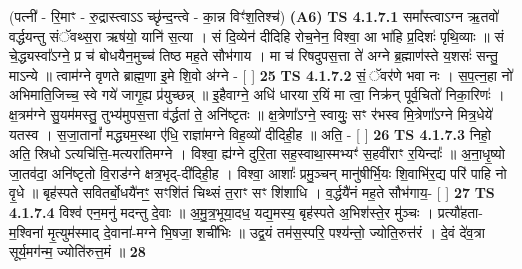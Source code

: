 \documentclass[17pt]{extarticle}
\begin{document}
                  \newline
                      (पत्नी॑ - रि॒माꣳ - रु॒द्रास्त्वाऽऽ च्छृ॑न्द॒न्त्वे - का॒न्न विꣳ॑श॒तिश्च॑)  \textbf{(A6)} \newline \newline
                                        \textbf{ TS 4.1.7.1} \newline
                  समा᳚स्त्वाऽग्न ऋ॒तवो॑ वर्द्धयन्तु संॅवथ्स॒रा ऋष॑यो॒ यानि॑ स॒त्या । सं दि॒व्येन॑ दीदिहि रोच॒नेन॒ विश्वा॒ आ भा॑हि प्र॒दिशः॑ पृथि॒व्याः ॥ सं चे॒द्ध्यस्वा᳚ऽग्ने॒ प्र च॑ बोधयैन॒मुच्च॑ तिष्ठ मह॒ते सौभ॑गाय । मा च॑ रिषदुपस॒त्ता ते॑ अग्ने ब्र॒ह्माण॑स्ते य॒शसः॑ सन्तु॒ माऽन्ये ॥ त्वाम॑ग्ने वृणते ब्राह्म॒णा इ॒मे शि॒वो अ॑ग्ने - [  ] \textbf{  25} \newline
                  \newline
                                \textbf{ TS 4.1.7.2} \newline
                  सं॒ ॅवर॑णे भवा नः । स॒प॒त्न॒हा नो॑ अभिमाति॒जिच्च॒ स्वे गये॑ जागृ॒ह्य प्र॑युच्छन्न् ॥ इ॒हैवाग्ने॒ अधि॑ धारया र॒यिं मा त्वा॒ निक्र॑न् पूर्व॒चितो॑ निका॒रिणः॑ । क्ष॒त्रम॑ग्ने सु॒यम॑मस्तु॒ तुभ्य॑मुपस॒त्ता व॑र्द्धतां ते॒ अनि॑ष्टृतः ॥ क्ष॒त्रेणा᳚ऽग्ने॒ स्वायुः॒ सꣳ र॑भस्व मि॒त्रेणा᳚ऽग्ने मित्र॒धेये॑ यतस्व । स॒जा॒तानां᳚ मद्ध्यम॒स्था ए॑धि॒ राज्ञा॑मग्ने विह॒व्यो॑ दीदिही॒ह ॥ अति॒ - [  ] \textbf{  26 } \newline
                  \newline
                                \textbf{ TS 4.1.7.3} \newline
                  निहो॒ अति॒ स्रिधो ऽत्यचि॑त्ति॒-मत्यरा॑तिमग्ने । विश्वा॒ ह्य॑ग्ने दुरि॒ता सह॒स्वाथा॒स्मभ्यꣳ॑ स॒हवी॑राꣳ र॒यिन्दाः᳚ ॥ अ॒ना॒धृ॒ष्यो जा॒तव॑दा॒ अनि॑ष्टृतो वि॒राड॑ग्ने क्षत्र॒भृद्-दी॑दिही॒ह । विश्वा॒ आशाः᳚ प्रमु॒ञ्चन् मानु॑षीर्भि॒यः शि॒वाभि॑र॒द्य परि॑ पाहि नो वृ॒धे ॥ बृह॑स्पते सवितर्बो॒धयै॑नꣳ॒॒ सꣳशि॑तं चिथ्सं त॒राꣳ सꣳ शि॑शाधि । व॒र्द्धयै॑नं मह॒ते सौभ॑गाय॒- [  ] \textbf{  27} \newline
                  \newline
                                \textbf{ TS 4.1.7.4} \newline
                  विश्व॑ एन॒मनु॑ मदन्तु दे॒वाः ॥ अ॒मु॒त्र॒भूया॒दध॒ यद्य॒मस्य॒ बृह॑स्पते अ॒भिश॑स्ते॒र मु॑ञ्चः । प्रत्यौ॑हता-म॒श्विना॑ मृ॒त्युम॑स्माद् दे॒वाना॑-मग्ने भि॒षजा॒ शची॑भिः ॥ उद्व॒यं तम॑स॒स्परि॒ पश्य॑न्तो॒ ज्योति॒रुत्त॑रं । दे॒वं दे॑व॒त्रा सूर्य॒मग॑न्म॒ ज्योति॑रुत्त॒मं ॥ \textbf{  28} \newline
                  \newline
\end{document}

